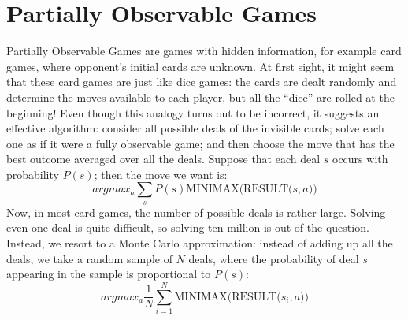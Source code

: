 \section{Partially Observable Games}
Partially Observable Games are games with hidden information, for example card games, where opponent’s initial cards are unknown.\newline\newline
At first sight, it might seem that these card games are just like dice games: the cards are dealt randomly and determine the moves available to each player, but all the “dice” are rolled at the beginning! Even though this analogy turns out to be incorrect, it suggests an effective algorithm: consider all possible deals of the invisible cards; solve each one as if it were a fully observable game; and then choose the move that has the best outcome averaged over all the deals. Suppose that each deal $s$ occurs with probability $P(s)$; then the move we want is:
\[argmax_a\sum_{s} P(s)\text{MINIMAX(RESULT($s, a$))}\]
Now, in most card games, the number of possible deals is rather large.  Solving even one deal is quite difficult, so solving ten million is out of the question. Instead, we resort to a Monte Carlo approximation: instead of adding up all the deals, we take a random sample of $N$ deals, where the probability of deal $s$ appearing in the sample is proportional to $P(s)$:
\[argmax_a \frac{1}{N} \sum_{i=1}^N \text{MINIMAX(RESULT($s_i, a$))}\]
